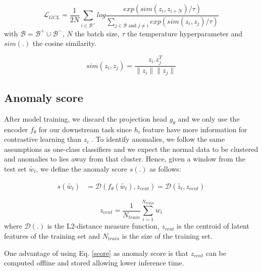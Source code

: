 \begin{equation}\label{gcl_loss}
    \mathcal{L}_{GCL} = \frac{1}{2N} \sum_{i \in \mathcal{B}^{+}} log \frac{exp(sim(z_i, z_{i+N})/\tau)}{\sum_{j \in \mathcal{B} \text{ and } j \neq i} exp(sim(z_i, z_j)/\tau)}
\end{equation}
with $\mathcal{B} = \mathcal{B}^{+} \cup \mathcal{B}^{-}$, $N$ the batch size, $\tau$ the temperature hyperparameter and $sim(.)$ the cosine similarity.

\begin{equation}\label{sim}
    sim(z_i, z_j) = \frac{z_i . z_j^{T}}{\|z_i\|\|z_j\|}
\end{equation}

\subsection{Anomaly score}\label{sec:anomaly}
After model training, we discard the projection head $g_{\theta}$ and we only use the encoder $f_{\theta}$ for our downstream task since $h_i$ feature have more information for contrastive learning than $z_i$ \cite{chen2020simple}. To identify anomalies, we follow the same assumptions as one-class classifiers and we expect the normal data to be clustered and anomalies to lies away from that cluster. Hence, given a window from the test set $\tilde{w_t}$, we define the anomaly score $s(.)$ as follows:

\begin{equation}\label{score}
\begin{split}
    s(\tilde{w_t}) &= \mathcal{D}(f_{\theta}(\tilde{w_t}), z_{cent}) =  \mathcal{D}(\tilde{z_t}, z_{cent})
\end{split}
\end{equation}

\begin{equation}
    z_{cent} = \frac{1}{N_{train}} \sum_{i=1}^{N_{train}} w_i
\end{equation}
where $\mathcal{D}(.)$ is the L2-distance measure function, $z_{cent}$ is the centroid of latent features of the training set and $N_{train}$ is the size of the training set. 

One advantage of using Eq. \ref{score} as anomaly score is that $z_{cent}$ can be computed offline and stored allowing lower inference time.

